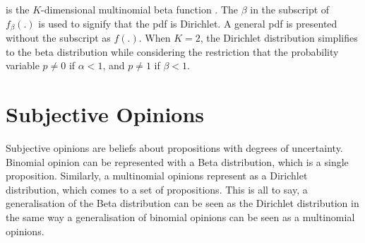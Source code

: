 \documentclass[a4,12pt]{ozu-thesis}
\begin{document}
is the $\mathit{K}$-dimensional multinomial beta function \cite{johnson2002continuous}. The $\beta$ in the subscript of $f_{\beta}\left ( . \right )$ is used to signify that the pdf is Dirichlet. A general pdf is presented without the subscript as $f\left ( . \right )$. When $\mathit{K} = 2$, the Dirichlet distribution simplifies to the beta distribution while considering the restriction that the probability variable $p \neq 0$ if $\alpha < 1$, and $p \neq 1$ if $\beta < 1$.

\section{Subjective Opinions}

Subjective opinions are beliefs about propositions with degrees of uncertainty. Binomial opinion can be represented with a Beta distribution, which is a single proposition. Similarly, a multinomial opinions represent as a Dirichlet distribution, which comes to a set of propositions. This is all to say, a generalisation of the Beta distribution can be seen as the Dirichlet distribution in the same way a generalisation of binomial opinions can be seen as a multinomial opinions.
\end{document}
